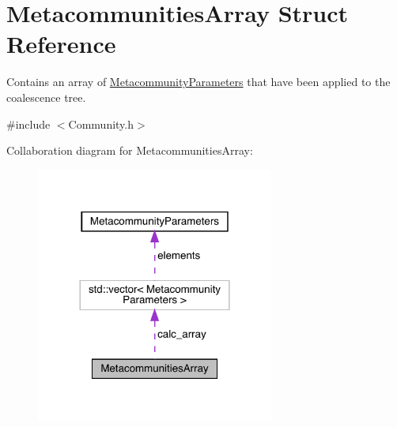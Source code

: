 \hypertarget{struct_metacommunities_array}{}\section{Metacommunities\+Array Struct Reference}
\label{struct_metacommunities_array}


Contains an array of \hyperlink{struct_metacommunity_parameters}{Metacommunity\+Parameters} that have been applied to the coalescence tree.  




{\ttfamily \#include $<$Community.\+h$>$}



Collaboration diagram for Metacommunities\+Array\+:
\nopagebreak
\begin{figure}[H]
\begin{center}
\leavevmode
\includegraphics[width=221pt]{struct_metacommunities_array__coll__graph}
\end{center}
\end{figure}
